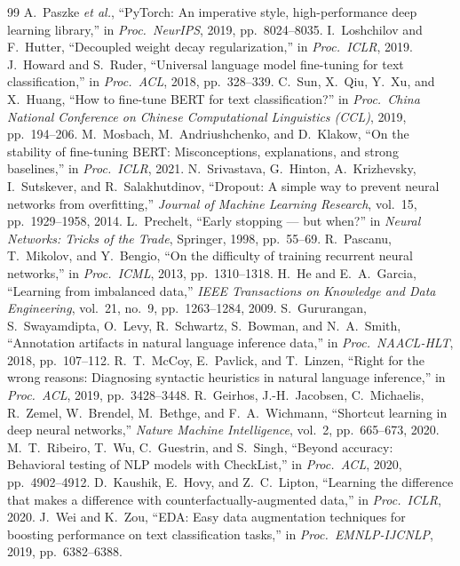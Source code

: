 \documentclass[12pt,a4paper]{article}
\begin{document}
\begin{thebibliography}{99}
 A.~Paszke \emph{et al.}, ``PyTorch: An imperative style, high-performance deep learning library,'' in \emph{Proc.\ NeurIPS}, 2019, pp.~8024--8035.
 I.~Loshchilov and F.~Hutter, ``Decoupled weight decay regularization,'' in \emph{Proc.\ ICLR}, 2019.
 J.~Howard and S.~Ruder, ``Universal language model fine-tuning for text classification,'' in \emph{Proc.\ ACL}, 2018, pp.~328--339.
 C.~Sun, X.~Qiu, Y.~Xu, and X.~Huang, ``How to fine-tune BERT for text classification?'' in \emph{Proc.\ China National Conference on Chinese Computational Linguistics (CCL)}, 2019, pp.~194--206.
 M.~Mosbach, M.~Andriushchenko, and D.~Klakow, ``On the stability of fine-tuning BERT: Misconceptions, explanations, and strong baselines,'' in \emph{Proc.\ ICLR}, 2021.
 N.~Srivastava, G.~Hinton, A.~Krizhevsky, I.~Sutskever, and R.~Salakhutdinov, ``Dropout: A simple way to prevent neural networks from overfitting,'' \emph{Journal of Machine Learning Research}, vol.~15, pp.~1929--1958, 2014.
 L.~Prechelt, ``Early stopping --- but when?'' in \emph{Neural Networks: Tricks of the Trade}, Springer, 1998, pp.~55--69.
 R.~Pascanu, T.~Mikolov, and Y.~Bengio, ``On the difficulty of training recurrent neural networks,'' in \emph{Proc.\ ICML}, 2013, pp.~1310--1318.
 H.~He and E.~A.~Garcia, ``Learning from imbalanced data,'' \emph{IEEE Transactions on Knowledge and Data Engineering}, vol.~21, no.~9, pp.~1263--1284, 2009.
 S.~Gururangan, S.~Swayamdipta, O.~Levy, R.~Schwartz, S.~Bowman, and N.~A.~Smith, ``Annotation artifacts in natural language inference data,'' in \emph{Proc.\ NAACL-HLT}, 2018, pp.~107--112.
 R.~T.~McCoy, E.~Pavlick, and T.~Linzen, ``Right for the wrong reasons: Diagnosing syntactic heuristics in natural language inference,'' in \emph{Proc.\ ACL}, 2019, pp.~3428--3448.
 R.~Geirhos, J.-H.~Jacobsen, C.~Michaelis, R.~Zemel, W.~Brendel, M.~Bethge, and F.~A.~Wichmann, ``Shortcut learning in deep neural networks,'' \emph{Nature Machine Intelligence}, vol.~2, pp.~665--673, 2020.
 M.~T.~Ribeiro, T.~Wu, C.~Guestrin, and S.~Singh, ``Beyond accuracy: Behavioral testing of NLP models with CheckList,'' in \emph{Proc.\ ACL}, 2020, pp.~4902--4912.
 D.~Kaushik, E.~Hovy, and Z.~C.~Lipton, ``Learning the difference that makes a difference with counterfactually-augmented data,'' in \emph{Proc.\ ICLR}, 2020.
 J.~Wei and K.~Zou, ``EDA: Easy data augmentation techniques for boosting performance on text classification tasks,'' in \emph{Proc.\ EMNLP-IJCNLP}, 2019, pp.~6382--6388.

\end{thebibliography}
\end{document}
